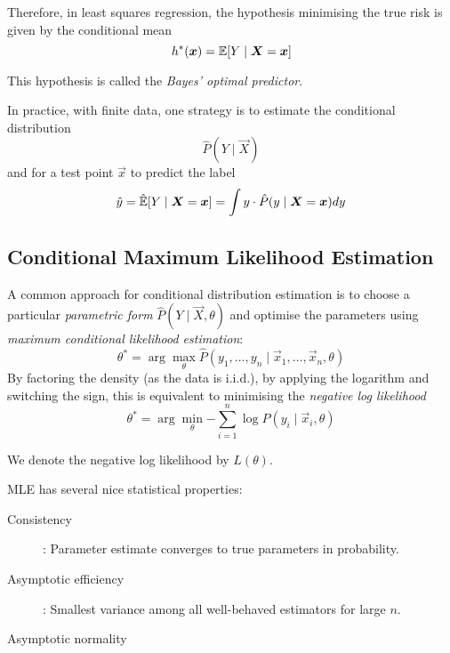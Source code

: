 Therefore, in least squares regression,
the hypothesis minimising the true risk
is given by the conditional mean
\begin{equation*}
h^*(\boldsymbol{x}) = \mathbb{E}[Y \mid \boldsymbol{X} = \boldsymbol{x}]
\end{equation*}

This hypothesis is called the
\emph{Bayes' optimal predictor}.

In practice, with finite data, one strategy
is to estimate the conditional distribution
\begin{equation*}
\hat{P}(Y \mid \vec{X})
\end{equation*}
and for a test point $\vec{x}$ to
predict the label
\begin{equation*}
\hat{y} = \hat{\mathbb{E}}[Y \mid \boldsymbol{X} = \boldsymbol{x}]
= \int{y \cdot \hat{P}(y \mid \boldsymbol{X} = \boldsymbol{x}) dy}
\end{equation*}


\subsection{Conditional Maximum Likelihood Estimation}
A common approach for conditional distribution estimation
is to choose a particular \emph{parametric form}
$\hat{P}(Y \mid \vec{X}, \theta)$
and optimise the parameters using
\emph{maximum conditional likelihood estimation}:
\begin{equation*}
\theta^* = \arg\max_\theta{
	\hat{P}(y_1, \dotsc, y_n \mid \vec{x}_1, \dotsc, \vec{x}_n, \theta)
}
\end{equation*}
By factoring the density (as the data is i.i.d.),
by applying the logarithm and switching the sign,
this is equivalent to minimising the
\emph{negative log likelihood}
\begin{equation*}
\theta^* = \arg\min_\theta{
	-\sum_{i=1}^n{\log{\hat{P}(y_i \mid \vec{x}_i, \theta)}}
}
\end{equation*}

We denote the negative log likelihood by $L(\theta)$.

MLE has several nice statistical properties:
\begin{description}
	\item[Consistency]: Parameter estimate
	converges to true parameters in probability.
	\item[Asymptotic efficiency]: Smallest
	variance among all well-behaved estimators
	for large $n$.
	\item[Asymptotic normality]
\end{description}


